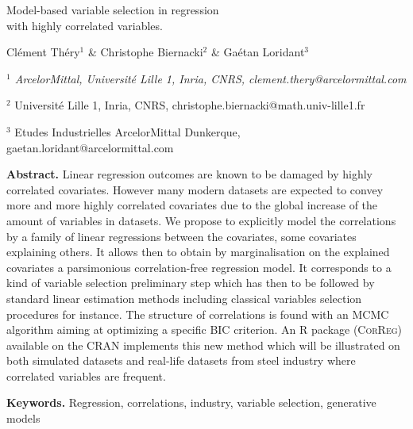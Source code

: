 \documentclass[11pt,a4paper]{article}
\begin{document}
\begin{center}
{\Large
	{\sc Model-based variable selection in regression \\ with highly correlated variables.}
}
\bigskip

  Clément Théry$^{1}$ \& Christophe Biernacki$^{2}$ \& Gaétan Loridant$^{3}$
\bigskip

{\it
$^{1}$ ArcelorMittal, Université Lille 1, Inria, CNRS, clement.thery@arcelormittal.com
 
$^{2}$ Université Lille 1, Inria, CNRS, christophe.biernacki@math.univ-lille1.fr

$^{3}$ Etudes Industrielles ArcelorMittal Dunkerque, gaetan.loridant@arcelormittal.com\textbf{}
}
\end{center}
\bigskip

{\bf Abstract.} Linear regression outcomes are known to be damaged by highly correlated covariates. However many modern datasets are expected to convey more and more highly correlated covariates due to the global increase of the amount of variables in datasets. We propose to explicitly model the correlations by a family of linear regressions between the covariates, some covariates explaining others. It allows then to obtain by marginalisation on the explained covariates a parsimonious correlation-free regression model. 
It corresponds to a kind of variable selection preliminary step which has then to be followed by standard linear estimation methods including classical variables selection procedures for instance. The structure of correlations is found with an MCMC algorithm aiming at optimizing a specific BIC criterion.
 An R package (\textsc{CorReg}) available on the CRAN implements this new method which will be illustrated on both simulated datasets and real-life datasets from steel industry where correlated variables are frequent.
\smallskip

{\bf Keywords.} Regression, correlations, industry, variable selection, generative models
\end{document}
